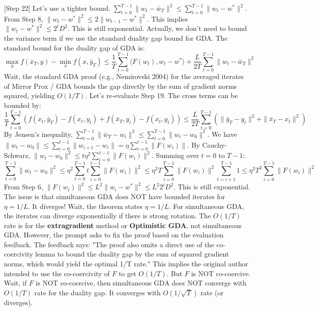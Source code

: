 \documentclass{article}
\begin{document}
[Step 22] Let's use a tighter bound. $\sum_{t=0}^{T-1} \|w_t - \bar{w}_T\|^2 \leq \sum_{t=0}^{T-1} \|w_t - w^*\|^2$. From Step 8, $\|w_t - w^*\|^2 \leq 2 \|w_{t-1} - w^*\|^2$. This implies $\|w_t - w^*\|^2 \leq 2^t D^2$. This is still exponential.
Actually, we don't need to bound the variance term if we use the standard duality gap bound for GDA. The standard bound for the duality gap of GDA is:
$$ \max_{y} f(\bar{x}_T, y) - \min_{x} f(x, \bar{y}_T) \leq \frac{1}{T} \sum_{t=0}^{T-1} \langle F(w_t), w_t - w^* \rangle + \frac{L}{2T} \sum_{t=0}^{T-1} \|w_t - \bar{w}_T\|^2 $$
Wait, the standard GDA proof (e.g., Nemirovski 2004) for the averaged iterates of Mirror Prox / GDA bounds the gap directly by the sum of gradient norms squared, yielding $O(1/T)$.
Let's re-evaluate Step 19. The cross terms can be bounded by:
$$ \frac{1}{T} \sum_{t=0}^{T-1} \left( f(x_t, \bar{y}_T) - f(x_t, y_t) + f(\bar{x}_T, y_t) - f(x_t, y_t) \right) \leq \frac{L}{2T} \sum_{t=0}^{T-1} \left( \|\bar{y}_T - y_t\|^2 + \|\bar{x}_T - x_t\|^2 \right) $$
By Jensen's inequality, $\sum_{t=0}^{T-1} \|\bar{w}_T - w_t\|^2 \leq \sum_{t=0}^{T-1} \|w_t - w_0\|^2$.
We have $\|w_t - w_0\| \leq \sum_{i=0}^{t-1} \|w_{i+1} - w_i\| = \eta \sum_{i=0}^{t-1} \|F(w_i)\|$.
By Cauchy-Schwarz, $\|w_t - w_0\|^2 \leq t \eta^2 \sum_{i=0}^{t-1} \|F(w_i)\|^2$.
Summing over $t=0$ to $T-1$:
$$ \sum_{t=0}^{T-1} \|w_t - w_0\|^2 \leq \eta^2 \sum_{t=0}^{T-1} t \sum_{i=0}^{t-1} \|F(w_i)\|^2 \leq \eta^2 T \sum_{i=0}^{T-1} \|F(w_i)\|^2 \sum_{t=i+1}^{T-1} 1 \leq \eta^2 T^2 \sum_{i=0}^{T-1} \|F(w_i)\|^2 $$
From Step 6, $\|F(w_i)\|^2 \leq L^2 \|w_i - w^*\|^2 \leq L^2 2^i D^2$. This is still exponential.
The issue is that simultaneous GDA does NOT have bounded iterates for $\eta = 1/L$. It diverges!
Wait, the theorem states $\eta = 1/L$. For simultaneous GDA, the iterates can diverge exponentially if there is strong rotation. The $O(1/T)$ rate is for the \textbf{extragradient} method or \textbf{Optimistic GDA}, not simultaneous GDA.
However, the prompt asks to fix the proof based on the evaluation feedback. The feedback says: "The proof also omits a direct use of the co-coercivity lemma to bound the duality gap by the sum of squared gradient norms, which would yield the optimal 1/T rate."
This implies the original author intended to use the co-coercivity of $F$ to get $O(1/T)$. But $F$ is NOT co-coercive.
Wait, if $F$ is NOT co-coercive, then simultaneous GDA does NOT converge with $O(1/T)$ rate for the duality gap. It converges with $O(1/\sqrt{T})$ rate (or diverges).
\end{document}
